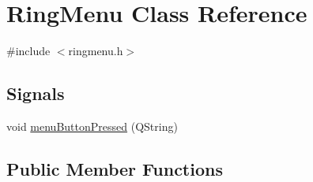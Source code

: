 \hypertarget{classRingMenu}{
\section{RingMenu Class Reference}
\label{classRingMenu}
}


{\ttfamily \#include $<$ringmenu.h$>$}

\subsection*{Signals}
\begin{DoxyCompactItemize}
\item 
void \hyperlink{classRingMenu_aa22f82a8f32d73a85d974f5825943d8c}{menuButtonPressed} (QString)
\end{DoxyCompactItemize}
\subsection*{Public Member Functions}
